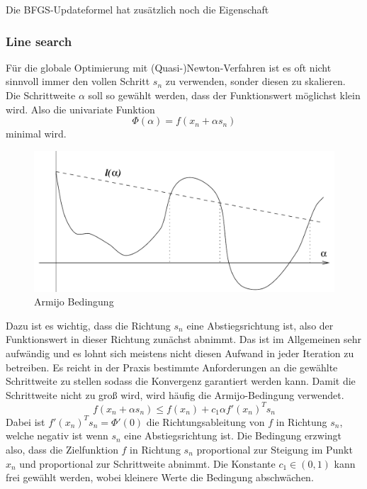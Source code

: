 \documentclass[runningheads,a4paper]{llncs}
\begin{document}
Die BFGS-Updateformel hat zusätzlich noch die Eigenschaft 

\subsubsection{Line search}

Für die globale Optimierung mit (Quasi-)Newton-Verfahren ist es oft nicht sinnvoll immer den vollen Schritt $s_n$ zu verwenden, sonder diesen zu skalieren. Die Schrittweite $\alpha$ soll so gewählt werden, dass der Funktionswert möglichst klein wird. Also die univariate Funktion
\begin{equation*}
\Phi(\alpha) = f(x_n + \alpha s_n)
\end{equation*}
minimal wird.

\begin{figure}[ht]
 \centering
 \includegraphics[scale=0.25]{armijo}
 \caption{Armijo Bedingung \cite{nocedal1999numerical}}
 \label{img:armijo}
\end{figure}

Dazu ist es wichtig, dass die Richtung $s_n$ eine Abstiegsrichtung ist, also der Funktionswert in dieser Richtung zunächst abnimmt. Das ist im Allgemeinen sehr aufwändig und es lohnt sich meistens nicht diesen Aufwand in jeder Iteration zu betreiben. Es reicht in der Praxis bestimmte Anforderungen an die gewählte Schrittweite zu stellen sodass die Konvergenz garantiert werden kann. Damit die Schrittweite nicht zu groß wird, wird häufig die Armijo-Bedingung verwendet.
\begin{equation}
\label{eq:armijo}
f(x_n+\alpha s_n) \le f(x_n)+c_1\alpha f'(x_n)^T s_n
\end{equation}
Dabei ist $f'(x_n)^T s_n = \Phi'(0)$ die Richtungsableitung von $f$ in Richtung $s_n$, welche negativ ist wenn $s_n$ eine Abstiegsrichtung ist. Die Bedingung erzwingt also, dass die Zielfunktion $f$ in Richtung $s_n$ proportional zur Steigung im Punkt $x_n$ und proportional zur Schrittweite abnimmt. Die Konstante $c_1 \in (0,1)$ kann frei gewählt werden, wobei kleinere Werte die Bedingung abschwächen.
\end{document}
